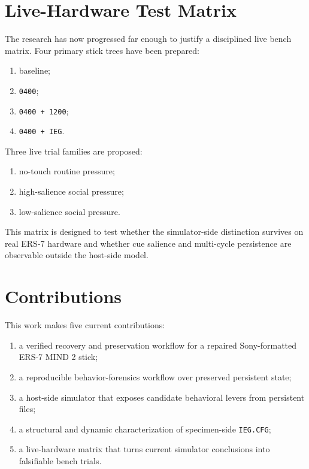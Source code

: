\documentclass[11pt]{article}
\begin{document}
\section{Live-Hardware Test Matrix}
The research has now progressed far enough to justify a disciplined live bench
matrix. Four primary stick trees have been prepared:
\begin{enumerate}[leftmargin=*]
\item baseline;
\item \texttt{0400};
\item \texttt{0400 + 1200};
\item \texttt{0400 + IEG}.
\end{enumerate}

Three live trial families are proposed:
\begin{enumerate}[leftmargin=*]
\item no-touch routine pressure;
\item high-salience social pressure;
\item low-salience social pressure.
\end{enumerate}

This matrix is designed to test whether the simulator-side distinction survives
on real ERS-7 hardware and whether cue salience and multi-cycle persistence are
observable outside the host-side model.

\section{Contributions}
This work makes five current contributions:
\begin{enumerate}[leftmargin=*]
\item a verified recovery and preservation workflow for a repaired Sony-formatted
ERS-7 MIND 2 stick;
\item a reproducible behavior-forensics workflow over preserved persistent state;
\item a host-side simulator that exposes candidate behavioral levers from
persistent files;
\item a structural and dynamic characterization of specimen-side
\texttt{IEG.CFG};
\item a live-hardware matrix that turns current simulator conclusions into
falsifiable bench trials.
\end{enumerate}
\end{document}
